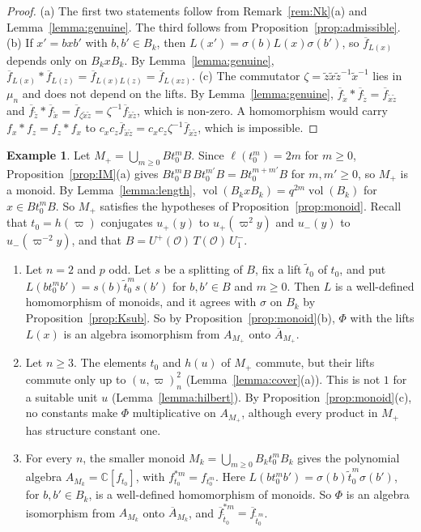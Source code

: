 \documentclass[12pt,letterpaper]{amsart}
\numberwithin{equation}{section}
\theoremstyle{definition}
\newtheorem{example}[theorem]{Example}
\theoremstyle{remark}
\DeclareMathOperator{\vol}{vol}
\newcommand{\cO}{\mathcal{O}}
\newcommand{\C}{\mathbb{C}}
\newcommand{\fbar}{\overline{f}}
\begin{document}
\begin{proof}
(a) The first two statements follow from Remark~\ref{rem:Nk}(a) and
Lemma~\ref{lemma:genuine}. The third follows from
Proposition~\ref{prop:admissible}. (b) If $x'=bxb'$ with $b,b'\in
B_k$, then $L(x')=\sigma(b)L(x)\sigma(b')$, so $\fbar_{L(x)}$ depends
only on $B_kxB_k$. By Lemma~\ref{lemma:genuine},
$\fbar_{L(x)}*\fbar_{L(z)}=\fbar_{L(x)L(z)}=\fbar_{L(xz)}$. (c) The
commutator $\zeta=\tilde z\tilde x\tilde z^{-1}\tilde x^{-1}$ lies in
$\mu_n$ and does not depend on the lifts. By Lemma~\ref{lemma:genuine},
$\fbar_{\tilde x}*\fbar_{\tilde z}=\fbar_{\tilde x\tilde z}$ and
$\fbar_{\tilde z}*\fbar_{\tilde x}=\fbar_{\zeta\tilde x\tilde
z}=\zeta^{-1}\fbar_{\tilde x\tilde z}$, which is non-zero. A
homomorphism would carry $f_x*f_z=f_z*f_x$ to
$c_xc_z\fbar_{\tilde x\tilde z}=c_xc_z\zeta^{-1}\fbar_{\tilde x\tilde
z}$, which is impossible.
\end{proof}

\begin{example}
\label{ex:monoid}
Let $M_+=\bigcup_{m\geq0}Bt_0^mB$. Since $\ell(t_0^m)=2m$ for $m\geq0$,
Proposition~\ref{prop:IM}(a) gives $Bt_0^mB\,Bt_0^{m'}B=Bt_0^{m+m'}B$
for $m,m'\geq0$, so $M_+$ is a monoid. By Lemma~\ref{lemma:length},
$\vol(B_kxB_k)=q^{2m}\vol(B_k)$ for $x\in Bt_0^mB$. So $M_+$ satisfies
the hypotheses of Proposition~\ref{prop:monoid}. Recall that
$t_0=h(\varpi)$ conjugates $u_+(y)$ to $u_+(\varpi^2y)$ and $u_-(y)$ to
$u_-(\varpi^{-2}y)$, and that $B=U^+(\cO)\,T(\cO)\,U^-_1$.
\begin{enumerate}[leftmargin=2em,label=(\roman*)]
\item Let $n=2$ and $p$ odd. Let $s$ be a splitting of $B$, fix a lift
$\tilde t_0$ of $t_0$, and put $L(bt_0^mb')=s(b)\tilde t_0^m s(b')$
for $b,b'\in B$ and $m\geq0$. Then $L$ is a well-defined homomorphism
of monoids, and it agrees with $\sigma$ on $B_k$ by
Proposition~\ref{prop:Ksub}. So by Proposition~\ref{prop:monoid}(b),
$\Phi$ with the lifts $L(x)$ is an algebra isomorphism from
$A_{M_+}$ onto $\overline A_{M_+}$.
\item Let $n\geq3$. The elements $t_0$ and $h(u)$ of $M_+$ commute,
but their lifts commute only up to $(u,\varpi)_n^2$
(Lemma~\ref{lemma:cover}(a)). This is not $1$ for a suitable unit $u$
(Lemma~\ref{lemma:hilbert}). By Proposition~\ref{prop:monoid}(c), no
constants make $\Phi$ multiplicative on $A_{M_+}$, although every
product in $M_+$ has structure constant one.
\item For every $n$, the smaller monoid
$M_k=\bigcup_{m\geq0}B_kt_0^mB_k$ gives the polynomial algebra
$A_{M_k}=\C[f_{t_0}]$, with $f_{t_0}^{*m}=f_{t_0^m}$. Here
$L(bt_0^mb')=\sigma(b)\tilde t_0^m\sigma(b')$, for $b,b'\in B_k$, is a
well-defined homomorphism of monoids. So $\Phi$ is an algebra
isomorphism from $A_{M_k}$ onto $\overline A_{M_k}$, and
$\fbar_{\tilde t_0}^{*m}=\fbar_{\tilde t_0^m}$.
\end{enumerate}
\end{example}
\end{document}
